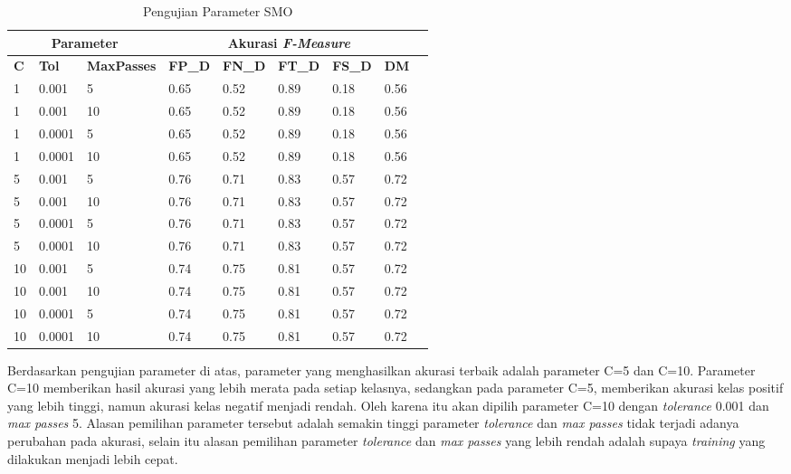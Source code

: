 \begin{table}[H]
	\caption{Pengujian Parameter SMO}
	\centering
	\small
	\begin{adjustbox}{width=1\textwidth}
	\begin{tabular}{|p{1.1cm}|p{1.7cm}|p{2cm}|p{1.1cm}|p{1.1cm}|p{1.1cm}|p{1.1cm}|p{1.1cm}|p{1.1cm}|}
		\hline
		\multicolumn{3}{|c|}{\textbf{Parameter}} & \multicolumn{5}{c|}{\textbf{Akurasi} \textit{\textbf{F-Measure}}} \\
		\hline
		\textbf{C} & \textbf{Tol} & \textbf{MaxPasses} & \textbf{FP\_D} & \textbf{FN\_D} & \textbf{FT\_D} & \textbf{FS\_D} & \textbf{DM} \\
		\hline
		1 & 0.001 & 5 & 0.65 & 0.52 & 0.89 & 0.18 & 0.56 \\
		\hline
		1 & 0.001 & 10 & 0.65 & 0.52 & 0.89 & 0.18 & 0.56 \\
		\hline
		1 & 0.0001 & 5 & 0.65 & 0.52 & 0.89 & 0.18 & 0.56 \\
		\hline
		1 & 0.0001 & 10 & 0.65 & 0.52 & 0.89 & 0.18 & 0.56 \\
		\hline
		5 & 0.001 & 5 & 0.76 & 0.71 & 0.83 & 0.57 & 0.72 \\
		\hline
		5 & 0.001 & 10 & 0.76 & 0.71 & 0.83 & 0.57 & 0.72 \\
		\hline
		5 & 0.0001 & 5 & 0.76 & 0.71 & 0.83 & 0.57 & 0.72 \\
		\hline
		5 & 0.0001 & 10 & 0.76 & 0.71 & 0.83 & 0.57 & 0.72 \\
		\hline
		10 & 0.001 & 5 & 0.74 & 0.75 & 0.81 & 0.57 & 0.72 \\
		\hline
		10 & 0.001 & 10 & 0.74 & 0.75 & 0.81 & 0.57 & 0.72 \\
		\hline
		10 & 0.0001 & 5 & 0.74 & 0.75 & 0.81 & 0.57 & 0.72 \\
		\hline
		10 & 0.0001 & 10 & 0.74 & 0.75 & 0.81 & 0.57 & 0.72 \\
		\hline
	\end{tabular}
	\end{adjustbox}
\end{table}
Berdasarkan pengujian parameter di atas, parameter yang menghasilkan akurasi terbaik adalah parameter C=5 dan C=10. Parameter C=10 memberikan hasil akurasi yang lebih merata pada setiap kelasnya, sedangkan pada parameter C=5, memberikan akurasi kelas positif yang lebih tinggi, namun akurasi kelas negatif menjadi rendah. Oleh karena itu akan dipilih parameter C=10 dengan \textit{tolerance }0.001 dan \textit{max passes
} 5. Alasan pemilihan parameter tersebut adalah semakin tinggi parameter \textit{tolerance }dan \textit{max passes} tidak terjadi adanya perubahan pada akurasi, selain itu alasan pemilihan parameter \textit{tolerance }dan \textit{max passes }yang lebih rendah adalah supaya \textit{training} yang dilakukan menjadi lebih cepat.

